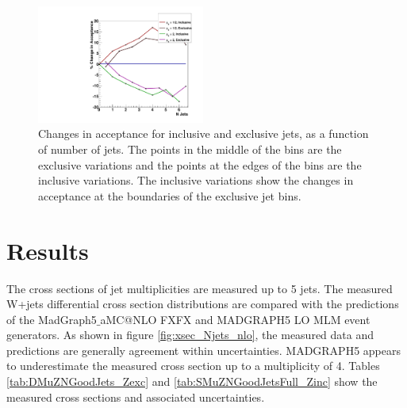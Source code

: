 \documentclass[oneside, letterpaper, oldfontcommands]{memoir}
\begin{document}
\begin{figure}[hbt]\centering
\includegraphics[width=0.49\textwidth]{energyScalesWJets.pdf}
 \centering 
 \caption{Changes in acceptance for inclusive and exclusive jets, as a function of number of jets. The points in the middle of the bins are the exclusive variations and the points at the edges of the bins are the inclusive variations. The inclusive variations show the changes in acceptance at the boundaries of the exclusive jet bins.}
 \label{fig:acceptances}\end{figure}
 
\section{Results}
\qquad The cross sections of jet multiplicities are measured up to 5 jets. The measured W+jets differential cross section distributions are compared with the predictions of the {\sc MadGraph5$\_$aMC@NLO} FXFX and MADGRAPH5 LO MLM event generators. As shown in figure \ref{fig:xsec_Njets_nlo}, the measured data and predictions are generally agreement within uncertainties. MADGRAPH5 appears to underestimate the measured cross section up to a multiplicity of 4. Tables \ref{tab:DMuZNGoodJets_Zexc} and \ref{tab:SMuZNGoodJetsFull_Zinc} show the measured cross sections and associated uncertainties.
\end{document}
